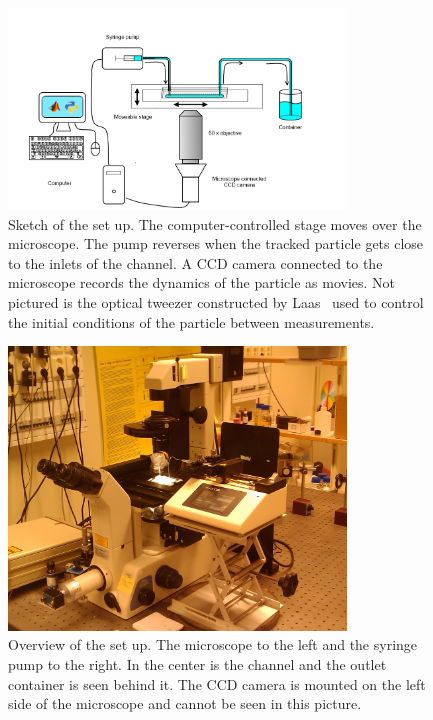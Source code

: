 \begin{figure}[H]
\centering
\includegraphics[width=0.8\textwidth]{figures/method/setupsketch.png}
\caption{Sketch of the set up. The computer-controlled stage moves over the microscope. The pump reverses when the tracked particle gets close to the inlets of the channel. A CCD camera connected to the microscope records the dynamics of the particle as movies. Not pictured is the optical tweezer constructed by Laas~\cite{alexanderThesis} used to control the initial conditions of the particle between measurements.	\label{fig:setupsketch}}
\end{figure}

\begin{figure}[H]
\centering
\includegraphics[width=0.8\textwidth]{figures/method/ExperimentalOverview.jpg}
\caption{Overview of the set up. The microscope to the left and the syringe pump to the right. In the center is the channel and the outlet container is seen behind it. The CCD camera is mounted on the left side of the microscope and cannot be seen in this picture.}\label{fig:setuppicture}
\end{figure}


